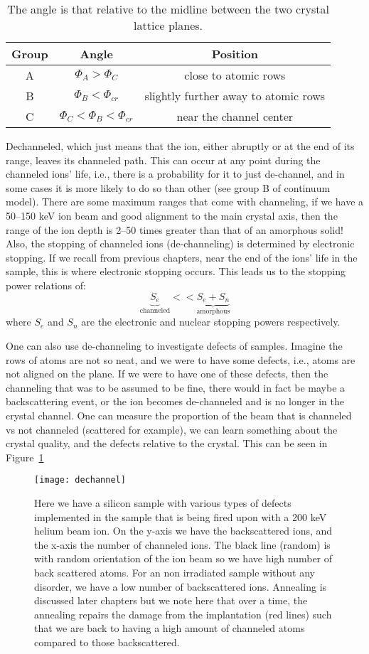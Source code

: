 \begin{table}[h]
	\centering
	\begin{tabular}{c | c | c }
		\hline
		Group & Angle & Position \\
		\hline
		A & $\Phi_A > \Phi_C$ & close to atomic rows \\
		B & $\Phi_B < \Phi_{cr}$ & slightly further away to atomic rows \\
		C & $\Phi_C < \Phi_B < \Phi_{cr}$ & near the channel center
	\end{tabular}
	\caption{The angle is that relative to the midline between the two crystal lattice planes.  }
    \label{tab:Continuum}
\end{table}
Dechanneled, which just means that the ion, either abruptly or at the end of its range, leaves its channeled path.
This can occur at any point during the channeled ions' life, i.e., there is a probability for it to just de-channel, and in some cases it is more likely to do so than other (see group B of continuum model).
There are some maximum ranges that come with channeling, if we have a 50--150 keV ion beam and good alignment to the main crystal axis, then the range of the ion depth is 2--50 times greater than that of an amorphous solid!
Also, the stopping of channeled ions (de-channeling) is determined by electronic stopping.
If we recall from previous chapters, near the end of the ions' life in the sample, this is where electronic stopping occurs.
This leads us to the stopping power relations of:
$$\underbrace{S_e}_\textrm{channeled} << \underbrace{S_e + S_n}_\textrm{amorphous} $$
where $S_e$ and $S_n$ are the electronic and nuclear stopping powers respectively.

One can also use de-channeling to investigate defects of samples.
Imagine the rows of atoms are not so neat, and we were to have some defects, i.e., atoms are not aligned on the plane.
If we were to have one of these defects, then the channeling that was to be assumed to be fine, there would in fact be maybe a backscattering event, or the ion becomes de-channeled and is no longer in the crystal channel.
One can measure the proportion of the beam that is channeled vs not channeled (scattered for example), we can learn something about the crystal quality, and the defects relative to the crystal.
This can be seen in Figure~\ref{fig:dech}

\begin{figure}
	\centering
	\texttt{[image: dechannel]}
	\caption{Here we have a silicon sample with various types of defects implemented in the sample that is being fired upon with a 200 keV helium beam ion. On the y-axis we have the backscattered ions, and the x-axis the number of channeled ions. The black line (random) is with random orientation of the ion beam so we have high number of back scattered atoms. For an non irradiated sample without any disorder, we have a low number of backscattered ions. Annealing is discussed later chapters but we note here that over a time, the annealing repairs the damage from the implantation (red lines) such that we are back to having a high amount of channeled atoms compared to those backscattered.}
	\label{fig:dech}
\end{figure}

